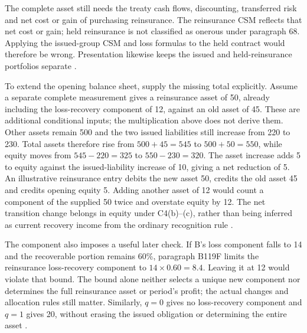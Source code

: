 The complete asset still needs the treaty cash flows, discounting, transferred
risk and net cost or gain of purchasing reinsurance. The reinsurance CSM
reflects that net cost or gain; held reinsurance is not classified as onerous
under paragraph 68. Applying the issued-group CSM and loss formulas to the
held contract would therefore be wrong. Presentation likewise keeps the
issued and held-reinsurance portfolios separate
\citep[paragraphs 65--68 and 78--79]{aasb17}.

\clearpage
To extend the opening balance sheet, supply the missing total explicitly.
Assume a separate complete measurement gives a reinsurance asset of 50,
already including the loss-recovery component of 12, against an old asset of
45. These are additional conditional inputs; the multiplication above does
not derive them. Other assets remain 500 and the two issued liabilities still
increase from 220 to 230. Total assets therefore rise from $500+45=545$ to
$500+50=550$, while equity moves from $545-220=325$ to $550-230=320$.
The asset increase adds 5 to equity against the issued-liability increase
of 10, giving a net reduction of 5. An illustrative reinsurance entry debits
the new asset 50, credits the old asset 45 and credits opening equity 5.
Adding another asset of 12 would count a component of the supplied 50 twice
and overstate equity by 12. The net transition change belongs in equity
under C4(b)--(c), rather than being inferred as current recovery income
from the ordinary recognition rule \citep[paragraphs C4--C5 and C20A]{aasb17}.

The component also imposes a useful later check. If B's loss component falls
to 14 and the recoverable portion remains 60\%, paragraph B119F limits the
reinsurance loss-recovery component to $14\times0.60=8.4$. Leaving it at 12
would violate that bound. The bound alone neither selects a unique new
component nor determines the full reinsurance asset or period's profit;
the actual changes and allocation rules still matter. Similarly, $q=0$
gives no loss-recovery component and $q=1$ gives 20, without erasing the
issued obligation or determining the entire asset
\citep[paragraphs 66--67 and B119F]{aasb17}.

\clearpage
